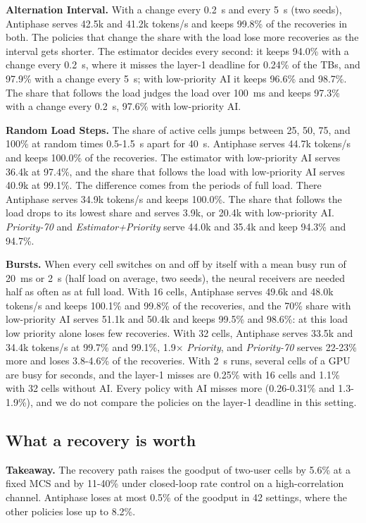 \documentclass[acmsmall,screen,review,anonymous]{acmart}
\newcommand{\sys}{Antiphase\xspace}
\begin{document}
\noindent\textbf{Alternation Interval.} With a change every 0.2~s and every 5~s (two seeds), \sys serves
42.5k and 41.2k tokens/s and keeps 99.8\% of the recoveries in both. The policies that change the share
with the load lose more recoveries as the interval gets shorter. The estimator decides every second: it
keeps 94.0\% with a change every 0.2~s, where it misses the layer-1 deadline for 0.24\% of the TBs, and
97.9\% with a change every 5~s; with low-priority AI it keeps 96.6\% and 98.7\%. The share that follows the
load judges the load over 100~ms and keeps 97.3\% with a change every 0.2~s, 97.6\% with low-priority AI.

\noindent\textbf{Random Load Steps.} The share of active cells jumps between 25, 50, 75, and 100\% at random
times 0.5-1.5~s apart for 40~s. \sys serves 44.7k tokens/s and keeps 100.0\% of the recoveries. The
estimator with low-priority AI serves 36.4k at 97.4\%, and the share that follows the load with low-priority
AI serves 40.9k at 99.1\%. The difference comes from the periods of full load. There \sys serves 34.9k
tokens/s and keeps 100.0\%. The share that follows the load drops to its lowest share and serves 3.9k, or
20.4k with low-priority AI. \textit{Priority-70} and \textit{Estimator+Priority} serve
44.0k and 35.4k and keep 94.3\% and 94.7\%.

\noindent\textbf{Bursts.} When every cell switches on and off by itself with a mean busy run of 20~ms or
2~s (half load on average, two seeds), the neural receivers are needed half as often as at full load. With
16 cells, \sys serves 49.6k and 48.0k tokens/s and keeps 100.1\% and 99.8\% of the recoveries, and the 70\%
share with low-priority AI serves 51.1k and 50.4k and keeps 99.5\% and 98.6\%: at this load low priority
alone loses few recoveries. With 32 cells, \sys serves 33.5k and 34.4k tokens/s at 99.7\% and 99.1\%,
1.9$\times$ \textit{Priority}, and \textit{Priority-70} serves 22-23\% more
and loses 3.8-4.6\% of the recoveries. With 2~s runs, several cells of a GPU are busy for seconds, and the
layer-1 misses are 0.25\% with 16 cells and 1.1\% with 32 cells without AI. Every policy with AI misses more
(0.26-0.31\% and 1.3-1.9\%), and we do not compare the policies on the layer-1 deadline in this setting.

\subsection{What a recovery is worth}
\label{sec:worth}

\noindent\textbf{Takeaway.} The recovery path raises the goodput of two-user cells by 5.6\% at a fixed MCS
and by 11-40\% under closed-loop rate control on a high-correlation channel. \sys loses at most 0.5\% of the
goodput in 42 settings, where the other policies
lose up to 8.2\%.
\end{document}
